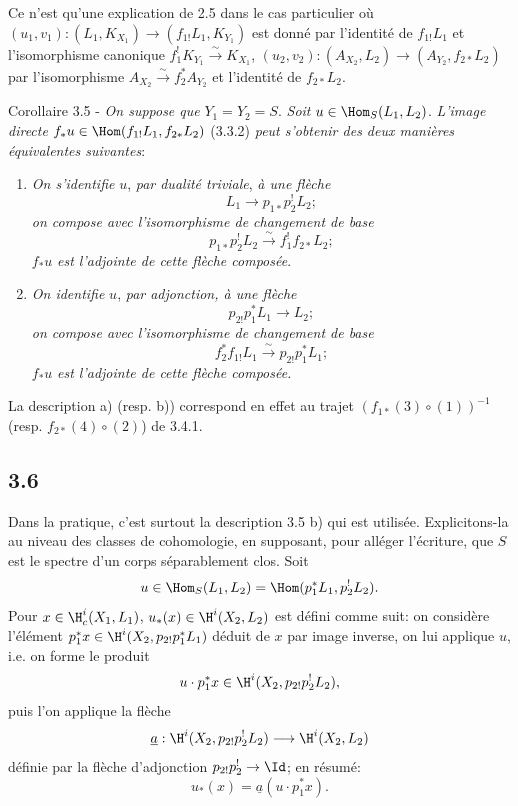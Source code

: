 Ce n'est qu'une explication de 2.5 dans le cas particulier où $(u_1,v_1):(L_1,K_{X_1})\to(f_{1!}L_1,K_{Y_1})$ est donné par l'identité de $f_{1!}L_1$ et l'isomorphisme canonique $f_1^!K_{Y_1}\xrightarrow{\sim}K_{X_1}$, $(u_2,v_2):(A_{X_2},L_2)\to(A_{Y_2},f_{2*}L_2)$ par l'isomorphisme  $A_{X_2}\xrightarrow{\sim}f_2^*A_{Y_2}$ et l'identité de $f_{2*}L_2$.

\begin{statement}{Corollaire 3.5 -}
\emph{On suppose que} $Y_1=Y_2=S$. \emph{Soit} $u\in\Hom_S(L_1,L_2)$. \emph{L'image directe} $f_*u\in\Hom(f_{1!}L_1,f_{2*}L_2)$ (3.3.2) \emph{peut s'obtenir des deux manières équivalentes suivantes}:
\end{statement}
\begin{enumerate}[label=\alph*)]
\item \emph{On s'}\emph{identifie} $u$, \emph{par dualité triviale}, \emph{à une flèche}
\[
L_1\longrightarrow p_{1*}p_2^!L_2;
\]
\emph{on compose avec l'isomorphisme de changement de base}
\[
p_{1*}p_2^!L_2\xrightarrow{\sim}f_1^!f_{2*}L_2;
\]
$f_*u$ \emph{est l'adjointe de cette flèche composée}.
\item \emph{On identifie} $u$, \emph{par adjonction, à une flèche}
\[
p_{2!}p_1^*L_1\longrightarrow L_2;
\]
\emph{on compose avec l'isomorphisme de changement de base}
\[
f_2^*f_{1!}L_1\xrightarrow{\sim}p_{2!}p_1^*L_1;
\]
$f_*u$ \emph{est l'adjointe de cette flèche composée.}
\end{enumerate}
La description a) (resp. b)) correspond en effet au trajet $(f_{1*}(3)\circ(1))^{-1}$ (resp. $f_{2*}(4)\circ(2)$) de 3.4.1.

\subsection*{3.6}
Dans la pratique, c'est surtout la description 3.5 b) qui est utilisée. Explicitons-la au niveau des classes de cohomologie, en supposant, pour alléger l'écriture, que $S$ est le spectre d'un corps séparablement clos. Soit
\[
u\in\Hom_S(L_1,L_2)=\Hom(p_1^*L_1,p_2^!L_2).
\]
Pour $x\in\H_c^i(X_1,L_1)$, $u_*(x)\in\H^i(X_2,L_2)$ est défini comme suit: on considère l'élément $p_1^*x\in\H^i(X_2,p_{2!}p_1^*L_1)$ déduit de $x$ par image inverse, on lui applique $u$, i.e. on forme le produit
\[
u\cdot p_1^*x\in \H^i(X_2,p_{2!}p_2^!L_2),
\]
puis l'on applique la flèche
\[
\underline{a}:\H^i(X_2,p_{2!}p_2^!L_2)\longrightarrow \H^i(X_2,L_2)
\]
définie par la flèche d'adjonction $p_{2!}p_2^!\to\Id$; en résumé:
\begin{equation}
u_*(x)=\underline{a}(u\cdot p_1^*x).
\tag{3.6.1}
\end{equation}

